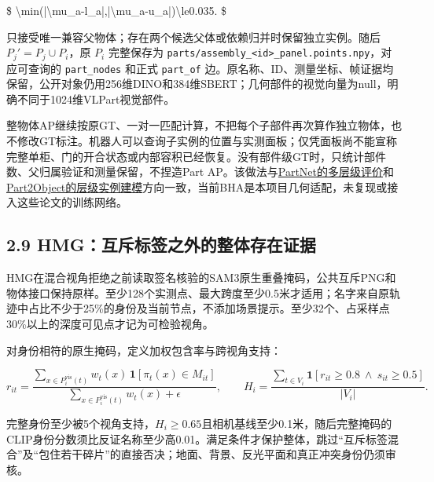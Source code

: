 \documentclass[UTF8,fontset=fandol]{ctexart}
\begin{document}
\$
\textbackslash{}min(|\textbackslash{}mu\_a-l\_a|,|\textbackslash{}mu\_a-u\_a|)\textbackslash{}le0.035.
\$



只接受唯一兼容父物体；存在两个候选父体或依赖归并时保留独立实例。随后 $P_j'=P_j\cup P_i$，原 $P_i$ 完整保存为 \texttt{parts/\allowbreak{}assembly\_\allowbreak{}<id>\_\allowbreak{}panel.\allowbreak{}points.\allowbreak{}npy}，对应可查询的 \texttt{part\_\allowbreak{}nodes} 和正式 \texttt{part\_\allowbreak{}of} 边。原名称、ID、测量坐标、帧证据均保留，公开对象仍用256维DINO和384维SBERT；几何部件的视觉向量为null，明确不同于1024维VLPart视觉部件。



整物体AP继续按原GT、一对一匹配计算，不把每个子部件再次算作独立物体，也不修改GT标注。机器人可以查询子实例的位置与实测面板；仅凭面板尚不能宣称完整单柜、门的开合状态或内部容积已经恢复。没有部件级GT时，只统计部件数、父归属验证和测量保留，不捏造Part AP。该做法与\href{https://arxiv.org/abs/1812.02713}{PartNet的多层级评价}和\href{https://github.com/SooLab/Part2Object}{Part2Object的层级实例建模}方向一致，当前BHA是本项目几何适配，未复现或接入这些论文的训练网络。



\subsection*{2.9 HMG：互斥标签之外的整体存在证据}

HMG在混合视角拒绝之前读取签名核验的SAM3原生重叠掩码，公共互斥PNG和物体接口保持原样。至少128个实测点、最大跨度至少0.5米才适用；名字来自原轨迹中占比不少于25\%的身份及当前节点，不添加场景提示。至少32个、占采样点30\%以上的深度可见点才记为可检验视角。



对身份相符的原生掩码，定义加权包含率与跨视角支持：



\[
r_{it}=\frac{\sum_{x\in P_i^{\mathrm{vis}}(t)}w_t(x)\,\mathbf1[\pi_t(x)\in M_{it}]}{\sum_{x\in P_i^{\mathrm{vis}}(t)}w_t(x)+\epsilon},\qquad
H_i=\frac{\sum_{t\in V_i}\mathbf1[r_{it}\geq0.8\ \land\ s_{it}\geq0.5]}{|V_i|}.
\]

完整身份至少被5个视角支持，$H_i\geq0.65$且相机基线至少0.1米，随后完整掩码的CLIP身份分数须比反证名称至少高0.01。满足条件才保护整体，跳过“互斥标签混合”及“包住若干碎片”的直接否决；地面、背景、反光平面和真正冲突身份仍须审核。
\end{document}
